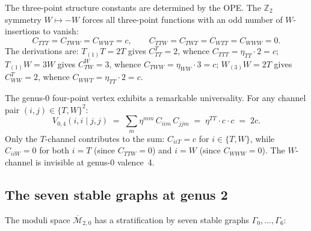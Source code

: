 The three-point structure constants are determined by the OPE.
The $\mathbb{Z}_2$ symmetry $W \mapsto -W$ forces all three-point
functions with an odd number of $W$-insertions to vanish:
\begin{equation}\label{eq:w3-C3}
C_{TTT} = C_{TWW} = C_{WWT} = c,
\qquad
C_{TTW} = C_{TWT} = C_{WTT} = C_{WWW} = 0.
\end{equation}
The derivations are:
$T_{(1)}T = 2T$ gives $C^T_{TT} = 2$, whence
$C_{TTT} = \eta_{TT} \cdot 2 = c$;
$T_{(1)}W = 3W$ gives $C^W_{TW} = 3$, whence
$C_{TWW} = \eta_{WW} \cdot 3 = c$;
$W_{(3)}W = 2T$ gives $C^T_{WW} = 2$, whence
$C_{WWT} = \eta_{TT} \cdot 2 = c$.

The genus-0 four-point vertex exhibits a remarkable universality.
For any channel pair $(i,j) \in \{T,W\}^2$:
\begin{equation}\label{eq:w3-V04}
V_{0,4}(i,i \mid j,j)
\;=\;
\sum_m \eta^{mm}\, C_{iim}\, C_{jjm}
\;=\;
\eta^{TT} \cdot c \cdot c
\;=\;
2c.
\end{equation}
Only the $T$-channel contributes to the sum: $C_{iiT} = c$ for
$i \in \{T,W\}$, while $C_{iiW} = 0$ for both $i = T$ (since
$C_{TTW} = 0$) and $i = W$ (since $C_{WWW} = 0$).
The $W$-channel is invisible at genus-0 valence~4.


\subsection{The seven stable graphs at genus 2}
\label{subsec:genus2-graphs}

The moduli space $\overline{\mathcal{M}}_{2,0}$ has a
stratification by seven stable graphs $\Gamma_0, \ldots, \Gamma_6$:

